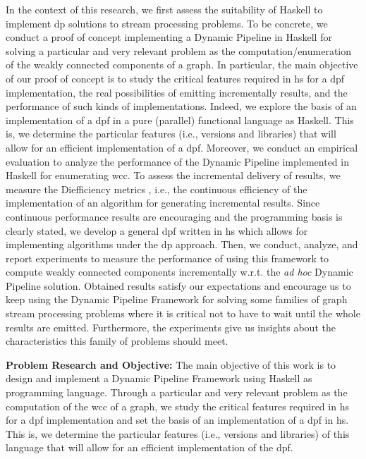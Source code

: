 In the context of this research, we first assess the suitability of Haskell  to implement \acrshort{dp} solutions to stream processing problems.
To be concrete, we conduct a proof of concept implementing a Dynamic Pipeline in  Haskell for solving a particular and very relevant problem as the computation/e\-nu\-me\-ra\-tion of the weakly connected components of a graph.
In particular, the main objective of our proof of concept is to study the critical features required in \acrshort{hs} for a \acrshort{dpf} implementation,  the real possibilities of emitting incrementally results, and the performance of such kinds of im\-ple\-men\-ta\-tions. 
Indeed, we explore the basis of an implementation of a \acrshort{dpf}  in a pure (parallel) functional language as Haskell. This is, we determine the particular features (i.e., versions and libraries) that will allow for an efficient implementation of a \acrshort{dpf}. Moreover, we conduct an empirical evaluation to analyze the performance of the Dynamic Pipeline implemented in Haskell for enumerating \acrshort{wcc}. To assess the incremental delivery of results, we measure the Diefficiency metrics \cite{diefpaper}, i.e., the continuous efficiency of the implementation of an algorithm for generating incremental results.
Since continuous performance results are encouraging and the programming basis is clearly stated, we develop a general \acrlong{dpf} written in \acrlong{hs} which allows for implementing algorithms under the \acrlong{dp} approach. Then, we conduct, analyze, and report experiments to measure the performance of using this framework to compute weakly connected components incrementally w.r.t. the \textit{ad hoc}  Dynamic Pipeline solution.  
Obtained results satisfy our expectations and encourage us to keep using the Dynamic Pipeline Framework for solving some families of graph stream processing problems where it is critical not to have to wait until the whole results are emitted. Furthermore, the experiments give us insights about the characteristics this family of problems should meet.

\textbf{Problem Research and Objective:}\label{research:obj} The main objective of this work is to design and implement a Dynamic Pipeline Framework using Haskell as programming language. Through a particular and very relevant problem as the computation of the \acrfull{wcc} of a graph, we study the critical features required in \acrshort{hs} for a \acrshort{dpf} implementation and set the basis of an implementation of a \acrshort{dpf}  in \acrshort{hs}. 
This is,  we determine the particular features (i.e., versions and libraries) of this language that will allow for an efficient implementation of the \acrshort{dpf}. 


